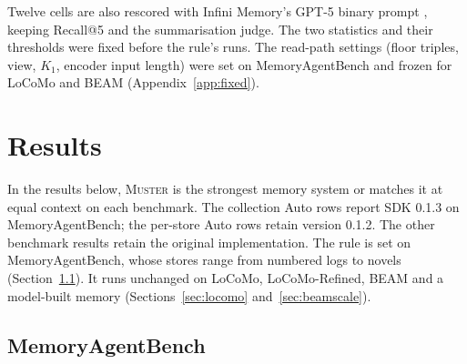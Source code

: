\documentclass{article}
\newcommand{\sys}{\textsc{Muster}}
\begin{document}
Twelve cells are also rescored with Infini Memory's GPT-5 binary prompt \cite{infini}, keeping Recall@5 and the summarisation judge.
The two statistics and their thresholds were fixed before the rule's runs. The read-path settings (floor
triples, view, $K_1$, encoder input length) were set on MemoryAgentBench and frozen for LoCoMo and BEAM (Appendix~\ref{app:fixed}).

\section{Results}\label{sec:results}

In the results below, \sys{} is the strongest memory system or matches it at equal context on each benchmark. The collection Auto rows report SDK 0.1.3 on MemoryAgentBench; the per-store Auto rows retain version 0.1.2. The other benchmark results retain the original implementation. The rule is set on MemoryAgentBench, whose stores range from numbered logs to novels (Section~\ref{sec:mabres}). It runs unchanged on LoCoMo, LoCoMo-Refined, BEAM and a model-built memory (Sections~\ref{sec:locomo} and~\ref{sec:beamscale}).

\subsection{MemoryAgentBench}\label{sec:mabres}
\end{document}

